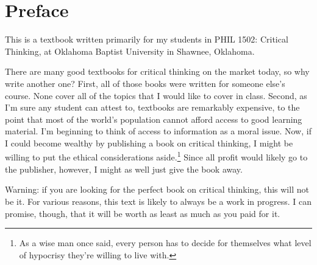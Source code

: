 
\chapter{Preface}
\label{chap:preface}

This is a textbook written primarily for my students in PHIL 1502: Critical Thinking, at Oklahoma Baptist University in Shawnee, Oklahoma.

There are many good textbooks for critical thinking on the market today, so why write another one? First, all of those books were written for someone else's course. None cover all of the topics that I would like to cover in class. Second, as I'm sure any student can attest to, textbooks are remarkably expensive, to the point that most of the world's population cannot afford access to good learning material. I'm beginning to think of access to information as a moral issue.  Now, if I could become wealthy by publishing a book on critical thinking, I might be willing to put the ethical considerations aside.\footnote{As a wise man once said, every person has to decide for themselves what level of hypocrisy they're willing to live with.} Since all profit would likely go to the publisher, however, I might as well just give the book away.

Warning: if you are looking for the perfect book on critical thinking, this will not be it. For various reasons, this text is likely to always be a work in progress. I can promise, though, that it will be worth as least as much as you paid for it.
